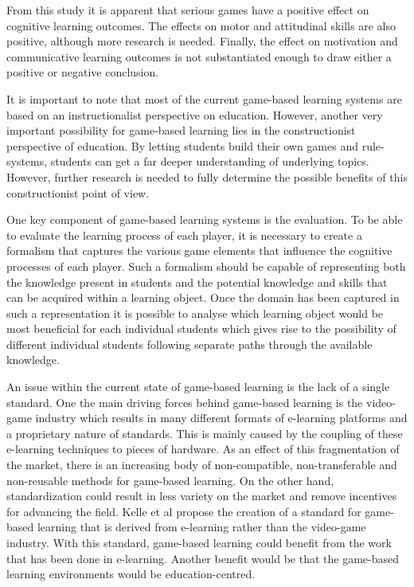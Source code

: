 \documentclass[11pt]{article}
\begin{document}
From this study it is apparent that serious games have a positive effect on cognitive learning outcomes. The effects on motor and attitudinal skills are also positive, although more research is needed. Finally, the effect on motivation and communicative learning outcomes is not substantiated enough to draw either a positive or negative conclusion.

It is important to note that most of the current game-based learning systems \cite{Groh2012} are based on an instructionalist perspective on education. However, another very important possibility for game-based learning lies in the constructionist \cite{Kafai2006, Becker2007} perspective of education. By letting students build their own games and rule-systems, students can get a far deeper understanding of underlying topics. However, further research is needed to fully determine the possible benefits of this constructionist point of view.

One key component of game-based \cite{Amory2006, Wouters2011} learning systems is the evaluation. To be able to evaluate the learning process of each player, it is necessary to create a formalism that captures the various game elements that influence the cognitive processes of each player. Such a formalism should be capable of representing both the knowledge present in students and the potential knowledge and skills that can be acquired within a learning object. Once the domain has been captured in such a representation it is possible \cite{Wouters2011,Staalduinen2011} to analyse which learning object would be most beneficial for each individual students which gives rise to the possibility of different individual students following separate paths through the available knowledge.

An issue within the current state of game-based learning is the lack of a single standard. One the main driving forces behind game-based learning is the video-game industry \cite{Kelle2011} which results in many different formats of e-learning platforms and a proprietary nature of standards. This is mainly caused by the coupling of these e-learning techniques to pieces of hardware. As an effect of this fragmentation of the market, there is an increasing body of non-compatible, non-transferable and non-reusable methods for game-based learning. On the other hand, standardization could result in less variety on the market and remove incentives for advancing the field. Kelle et al propose the creation of a standard for game-based learning that is derived from e-learning rather than the video-game industry. With this standard, game-based learning could benefit from the work that has been done in e-learning. Another benefit would be that the game-based learning environments would be education-centred.
\end{document}
